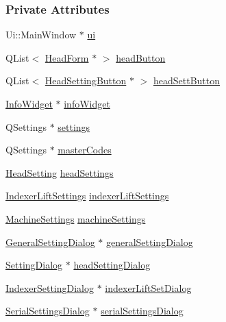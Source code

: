 \subsubsection*{Private Attributes}
\begin{DoxyCompactItemize}
\item 
Ui\+::\+Main\+Window $\ast$ \mbox{\hyperlink{classMainWindow_a35466a70ed47252a0191168126a352a5}{ui}}
\item 
Q\+List$<$ \mbox{\hyperlink{classHeadForm}{Head\+Form}} $\ast$ $>$ \mbox{\hyperlink{classMainWindow_aee1f0ef16a77d46e13672b5219cadef7}{head\+Button}}
\item 
Q\+List$<$ \mbox{\hyperlink{classHeadSettingButton}{Head\+Setting\+Button}} $\ast$ $>$ \mbox{\hyperlink{classMainWindow_a5fc117f7fb33eaa3bd4a40f63eb1d32c}{head\+Sett\+Button}}
\item 
\mbox{\hyperlink{classInfoWidget}{Info\+Widget}} $\ast$ \mbox{\hyperlink{classMainWindow_a1ec5a697ad1c0526e4979dd538d11f20}{info\+Widget}}
\item 
Q\+Settings $\ast$ \mbox{\hyperlink{classMainWindow_a4d8dbbb57b71b4fde207e465526a6753}{settings}}
\item 
Q\+Settings $\ast$ \mbox{\hyperlink{classMainWindow_a92c60042483f6bcdef44a4b06bec8795}{master\+Codes}}
\item 
\mbox{\hyperlink{classHeadSetting}{Head\+Setting}} \mbox{\hyperlink{classMainWindow_abfbbbda04b8875212b6c12d3bf6f94cb}{head\+Settings}}
\item 
\mbox{\hyperlink{classIndexerLiftSettings}{Indexer\+Lift\+Settings}} \mbox{\hyperlink{classMainWindow_ab8dfb97cd685ef6fb299506ddc2e6170}{indexer\+Lift\+Settings}}
\item 
\mbox{\hyperlink{classMachineSettings}{Machine\+Settings}} \mbox{\hyperlink{classMainWindow_ae8dd8666bcd48aebe9f7a00017dff875}{machine\+Settings}}
\item 
\mbox{\hyperlink{classGeneralSettingDialog}{General\+Setting\+Dialog}} $\ast$ \mbox{\hyperlink{classMainWindow_ac52bc1afdcda6200044e85a40de61c52}{general\+Setting\+Dialog}}
\item 
\mbox{\hyperlink{classSettingDialog}{Setting\+Dialog}} $\ast$ \mbox{\hyperlink{classMainWindow_ae13512af59f04b0fb3bf6bf3f8d4cca1}{head\+Setting\+Dialog}}
\item 
\mbox{\hyperlink{classIndexerSettingDialog}{Indexer\+Setting\+Dialog}} $\ast$ \mbox{\hyperlink{classMainWindow_ab0cf5f0fbfa991a1a6fe78ef34db6ac3}{indexer\+Lift\+Set\+Dialog}}
\item 
\mbox{\hyperlink{classSerialSettingsDialog}{Serial\+Settings\+Dialog}} $\ast$ \mbox{\hyperlink{classMainWindow_a5f2e9273d4144c9f5f63b68bbaa6b7b1}{serial\+Settings\+Dialog}}

\end{DoxyCompactItemize}
